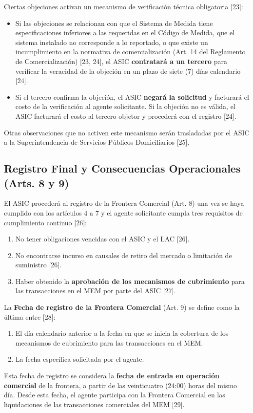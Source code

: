 \documentclass[a5paper]{book}%
\begin{document}
Ciertas objeciones activan un mecanismo de verificación técnica obligatoria [23]:

\begin{itemize}
	\item Si las objeciones se relacionan con que el Sistema de Medida tiene especificaciones inferiores a las requeridas en el Código de Medida, que el sistema instalado no corresponde a lo reportado, o que existe un incumplimiento en la normativa de comercialización (Art. 14 del Reglamento de Comercialización) [23, 24], el ASIC \textbf{contratará a un tercero} para verificar la veracidad de la objeción en un plazo de siete (7) días calendario [24].
	\item Si el tercero confirma la objeción, el ASIC \textbf{negará la solicitud} y facturará el costo de la verificación al agente solicitante. Si la objeción no es válida, el ASIC facturará el costo al tercero objetor y procederá con el registro [24].
\end{itemize}
Otras observaciones que no activen este mecanismo serán trasladadas por el ASIC a la Superintendencia de Servicios Públicos Domiciliarios [25].

\subsection{Registro Final y Consecuencias Operacionales (Arts. 8\textdegree{} y 9\textdegree)}

El ASIC procederá al registro de la Frontera Comercial (Art. 8\textdegree) una vez se haya cumplido con los artículos 4\textdegree{} a 7\textdegree{} y el agente solicitante cumpla tres requisitos de cumplimiento continuo [26]:
\begin{enumerate}
	\item No tener obligaciones vencidas con el ASIC y el LAC [26].
	\item No encontrarse incurso en causales de retiro del mercado o limitación de suministro [26].
	\item Haber obtenido la \textbf{aprobación de los mecanismos de cubrimiento} para las transacciones en el MEM por parte del ASIC [27].
\end{enumerate}

La \textbf{Fecha de registro de la Frontera Comercial} (Art. 9\textdegree) se define como la última entre [28]:
\begin{enumerate}
	\item El día calendario anterior a la fecha en que se inicia la cobertura de los mecanismos de cubrimiento para las transacciones en el MEM.
	\item La fecha específica solicitada por el agente.
\end{enumerate}
Esta fecha de registro se considera la \textbf{fecha de entrada en operación comercial} de la frontera, a partir de las veinticuatro (24:00) horas del mismo día. Desde esta fecha, el agente participa con la Frontera Comercial en las liquidaciones de las transacciones comerciales del MEM [29].
\end{document}
